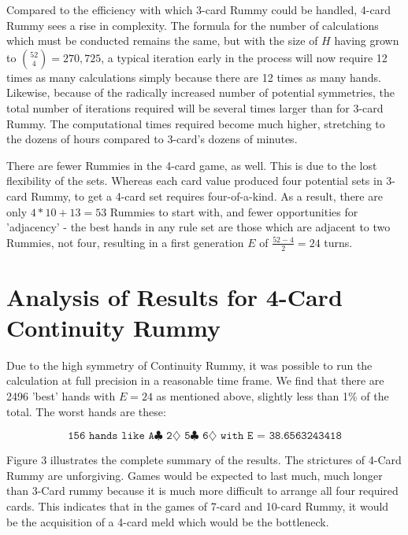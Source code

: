 \documentclass[paper=a4, fontsize=11pt,twoside]{report}   %
\begin{document}
Compared to the efficiency with which 3-card Rummy could be handled, 4-card Rummy sees a rise in complexity. The formula for the number of calculations which must be conducted remains the same, but with the size of $H$ having grown to $\binom{52}{4} = 270,725$, a typical iteration early in the process will now require 12 times as many calculations simply because there are 12 times as many hands. Likewise, because of the radically increased number of potential symmetries, the total number of iterations required will be several times larger than for 3-card Rummy. The computational times required become much higher, stretching to the dozens of hours compared to 3-card's dozens of minutes.

There are fewer Rummies in the 4-card game, as well. This is due to the lost flexibility of the sets. Whereas each card value produced four potential sets in 3-card Rummy, to get a 4-card set requires four-of-a-kind. As a result, there are only $4*10 + 13 = 53$ Rummies to start with, and fewer opportunities for 'adjacency' - the best hands in any rule set are those which are adjacent to two Rummies, not four, resulting in a first generation $E$ of $\frac{52-4}{2} = 24$ turns.

\section{Analysis of Results for 4-Card Continuity Rummy}

Due to the high symmetry of Continuity Rummy, it was possible to run the calculation at full precision in a reasonable time frame. We find that there are 2496 'best' hands with $E=24$ as mentioned above, slightly less than 1$\%$ of the total. The worst hands are these:

$$\texttt{156 hands like A$\clubsuit$ 2$\diamondsuit$ 5$\clubsuit$ 6$\diamondsuit$ with E = 38.6563243418}$$

Figure 3 illustrates the complete summary of the results. The strictures of 4-Card Rummy are unforgiving. Games would be expected to last much, much longer than 3-Card rummy because it is much more difficult to arrange all four required cards. This indicates that in the games of 7-card and 10-card Rummy, it would be the acquisition of a 4-card meld which would be the bottleneck.
\end{document}
